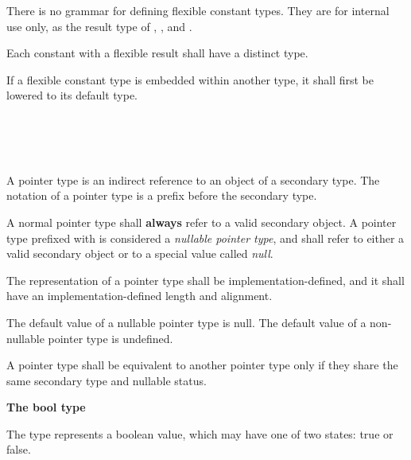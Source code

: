 \specsubsubitem
There is no grammar for defining flexible constant types. They are for internal
use only, as the result type of ,
, and .

\specsubsubitem
Each constant with a flexible result shall have a distinct type.

\specsubsubitem
If a flexible constant type is embedded within another type, it shall first be
lowered to its default type.



\begin{grammar}
 \\
	\terminal{*}  \\
	 \terminal{*}  \\
\end{grammar}

\specsubsubitem
A pointer type is an indirect reference to an object of a secondary type. The
notation of a pointer type is a \terminal{*} prefix before the secondary type.

\specsubsubitem
A normal pointer type shall \textbf{always} refer to a valid secondary object.
A pointer type prefixed with  is considered a
\textit{nullable pointer type}, and shall refer to either a valid secondary object
or to a special value called \textit{null}.

\specsubsubitem
The representation of a pointer type shall be implementation-defined, and it
shall have an implementation-defined length and alignment.

\specsubsubitem
The default value of a nullable pointer type is null. The default value of a
non-nullable pointer type is undefined.

\specsubsubitem
A pointer type shall be equivalent to another pointer type only if they share
the same secondary type and nullable status.


\textbf{The bool type}

\specsubsubitem
The  type represents a boolean value, which may have one of two
states: true or false.

